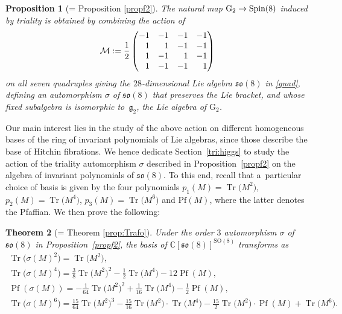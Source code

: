 \documentclass[pdftex]{sigma}
\numberwithin{equation}{section}
\newcommand{\Pf}{\operatorname{Pf}}
\newcommand{\GG}{{\rm G}_2}
\newcommand{\Tr}{\operatorname{Tr}}
\newtheorem{Theorem}{Theorem}[section]
\newtheorem{Proposition}[Theorem]{Proposition}
 { \theoremstyle{definition}
\newtheorem{Definition}[Theorem]{Definition}
\newtheorem{Remark}[Theorem]{Remark} }
\begin{document}
\begin{Proposition}[= Proposition \ref{propf2}] The natural map $\GG \rightarrow \rm Spin(8)$ induced by triality is obtained by combining the action of \begin{equation*}\mathcal{M} := \frac{1}{2} \begin{pmatrix}
-1 & -1 & -1 & -1 \\
\hphantom{-}1 & \hphantom{-}1 & -1 & -1 \\
\hphantom{-}1 & -1 & \hphantom{-}1 & -1 \\
\hphantom{-}1 & -1 & -1 & \hphantom{-}1
\end{pmatrix}
\end{equation*} on all seven quadruples giving the $28$-dimensional Lie algebra $\mathfrak{so}(8)$ in \eqref{quad}, defining an automorphism $\sigma$ of $\mathfrak{so}(8)$ that preserves the Lie bracket, and whose fixed subalgebra is isomorphic to~$\mathfrak{g}_2$, the Lie algebra of $\mathrm{G}_2$.
\end{Proposition}

Our main interest lies in the study of the above action on different homogeneous bases of the ring of invariant polynomials of Lie algebras, since those describe the base of Hitchin fibrations. We hence dedicate Section~\ref{tri:higgs} to study the action of the triality automorphism $\sigma$ described in Proposition~\ref{propf2} on the algebra of invariant polynomials of $\mathfrak{so}(8)$. To this end, recall that a~particular choice of basis is given by the four polynomials $p_1(M) = \Tr\big(M^2\big)$, $p_2 (M) = \Tr\big(M^4\big)$, $p_3 (M) = \Tr\big(M^6\big)$ and $\mathrm{Pf}(M)$, where the latter denotes the Pfaffian. We then prove the following:

\begin{Theorem}[= Theorem \ref{prop:Trafo}] Under the order $3$ automorphism $\sigma$ of $\mathfrak{so}(8)$ in Proposition~{\rm \ref{propf2}}, the basis of $\mathbb{C}[\mathfrak{so}(8)]^{\mathrm{SO}(8)}$ transforms as
\begin{gather*}
\Tr\big(\sigma(M)^2\big) = \Tr\big(M^2\big), \\
\Tr\big(\sigma(M)^4\big) = \frac{3}{8} \Tr\big(M^2\big)^2 - \frac{1}{2} \Tr\big(M^4\big) -12 \Pf (M) , \\
\Pf (\sigma(M)) = - \frac{1}{64} \Tr\big(M^2\big)^2 + \frac{1}{16} \Tr\big(M^4\big) -\frac{1}{2} \Pf (M), \\
\Tr\big(\sigma(M)^6\big) = \frac{15}{64} \Tr\big(M^2\big)^3 - \frac{15}{16} \Tr\big(M^2\big) \cdot \Tr\big(M^4\big) - \frac{15}{2} \Tr\big(M^2\big) \cdot \Pf(M) + \Tr\big(M^6\big).
\end{gather*}
\end{Theorem}
\end{document}
